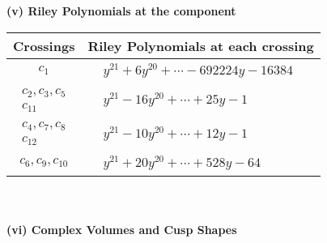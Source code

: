 \documentclass[1p]{elsarticle_modified}
\theoremstyle{definition}
\begin{document}
\newpage\renewcommand{\arraystretch}{1}
\flushleft \textbf{(v) Riley Polynomials at the component}\newline \\
\begin{tabular}{m{50pt}|m{274pt}}
Crossings & \hspace{64pt}Riley Polynomials at each crossing \\
\hline $$\begin{aligned}c_{1}\end{aligned}$$&$\begin{aligned}
&y^{21}+6 y^{20}+\cdots-692224 y-16384
\end{aligned}$\\
\hline $$\begin{aligned}c_{2},c_{3},c_{5}\\c_{11}\end{aligned}$$&$\begin{aligned}
&y^{21}-16 y^{20}+\cdots+25 y-1
\end{aligned}$\\
\hline $$\begin{aligned}c_{4},c_{7},c_{8}\\c_{12}\end{aligned}$$&$\begin{aligned}
&y^{21}-10 y^{20}+\cdots+12 y-1
\end{aligned}$\\
\hline $$\begin{aligned}c_{6},c_{9},c_{10}\end{aligned}$$&$\begin{aligned}
&y^{21}+20 y^{20}+\cdots+528 y-64
\end{aligned}$\\
\hline
\end{tabular}\\~\\
\newpage\flushleft \textbf{(vi) Complex Volumes and Cusp Shapes}
\end{document}
